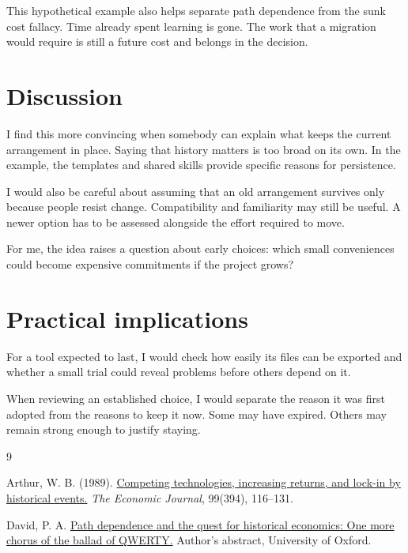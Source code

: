 \documentclass[11pt,a4paper]{article}
\begin{document}
This hypothetical example also helps separate path dependence from the
sunk cost fallacy. Time already spent learning is gone. The work that a
migration would require is still a future cost and belongs in the decision.

\section{Discussion}

I find this more convincing when somebody can explain what keeps the
current arrangement in place. Saying that history matters is too broad
on its own. In the example, the templates and shared skills provide
specific reasons for persistence.

I would also be careful about assuming that an old arrangement survives
only because people resist change. Compatibility and familiarity may
still be useful. A newer option has to be assessed alongside the effort
required to move.

For me, the idea raises a question about early choices: which small
conveniences could become expensive commitments if the project grows?

\section{Practical implications}

For a tool expected to last, I would check how easily its files can be
exported and whether a small trial could reveal problems before others
depend on it.

When reviewing an established choice, I would separate the reason it
was first adopted from the reasons to keep it now. Some may have expired.
Others may remain strong enough to justify staying.

\renewcommand{\refname}{References}
\begin{thebibliography}{9}
\small
\setlength{\itemsep}{0.35em}

Arthur, W. B. (1989).
\href{https://doi.org/10.2307/2234208}
{Competing technologies, increasing returns, and lock-in by historical events.}
\textit{The Economic Journal}, 99(394), 116--131.

David, P. A.
\href{https://www.nuffield.ox.ac.uk/economics/history/paper20/path.htm}
{Path dependence and the quest for historical economics:
One more chorus of the ballad of QWERTY.}
Author's abstract, University of Oxford.

\end{thebibliography}
\end{document}
